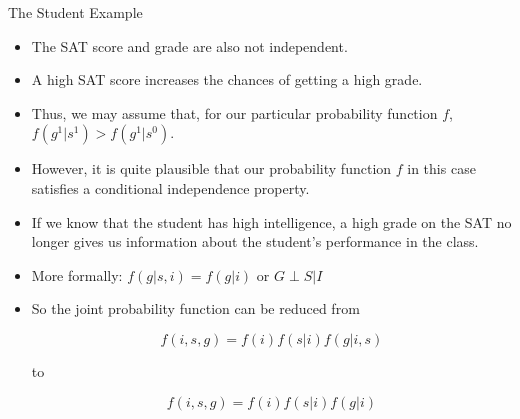 \documentclass[handout]{beamer}
\begin{document}
\begin{frame}{The Student Example}
\scriptsize{
\begin{itemize}

\item The SAT score and grade are also not independent.
\item A high SAT score increases the chances of getting a high grade.

\item Thus, we may assume that, for our particular probability function  $f$,
$f(g^1|s^1) > f(g^1|s^0)$.

\item However, it is quite plausible that our probability function $f$ in this case satisfies a conditional independence property.

\item If we know that the student has high intelligence, a high grade on the SAT no longer gives us information about the student's performance in the class.

\item More formally: $f(g|s,i)=f(g|i)$ or $G \perp S|I$

\item So the joint probability function  can be reduced from

\begin{displaymath}
 f(i,s,g)=f(i)f(s|i)f(g|i,s)
\end{displaymath}

to

\begin{displaymath}
 f(i,s,g)=f(i)f(s|i)f(g|i) 
\end{displaymath}


\end{itemize}



} 

\end{frame}
\end{document}
